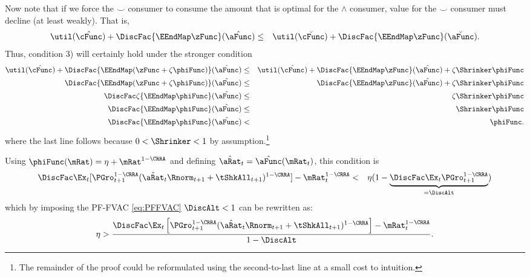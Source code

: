 \documentclass[titlepage]{\econtex}\providecommand{\texname}{BufferStockTheory}
\begin{document}
Now note that if we force the $\smile$ consumer to consume the amount that is
optimal for the $\wedge$ consumer, value for the $\smile$ consumer must decline (at least weakly).  That is,
\begin{eqnarray*}
\util(\hat{\cFunc})+\DiscFac \{\EEndMap \zFunc \}(\hat{\aFunc})  & \leq &\util(\breve{\cFunc})+\DiscFac \{\EEndMap \zFunc \}(\breve{\aFunc})
.
\end{eqnarray*}
Thus, condition 3) will certainly hold under the stronger condition
\begin{eqnarray*}
\util(\hat{\cFunc})+\DiscFac\{\EEndMap (\zFunc+\zeta \phiFunc) \}(\hat{\aFunc})  & \leq & \util(\hat{\cFunc})+\DiscFac\{\EEndMap \zFunc \}(\hat{\aFunc})  + \zeta \Shrinker \phiFunc
\\ \DiscFac\{\EEndMap (\zFunc+\zeta \phiFunc) \}(\hat{\aFunc})  & \leq & \DiscFac\{\EEndMap \zFunc  \}(\hat{\aFunc})  + \zeta \Shrinker \phiFunc
\\ \DiscFac\zeta \{\EEndMap \phiFunc \}(\hat{\aFunc})  & \leq & \zeta \Shrinker \phiFunc
\\ \DiscFac\{\EEndMap \phiFunc \}(\hat{\aFunc})  & \leq & \Shrinker \phiFunc
\\ \DiscFac\{\EEndMap \phiFunc \}(\hat{\aFunc})  & < & \phiFunc \label{eq:reqCondWeak}
.
\end{eqnarray*}
where the last line follows because $0 < \Shrinker < 1$ by assumption.\footnote{The remainder of the proof could be reformulated using the second-to-last line at a small cost to intuition.}
  
Using $\phiFunc(\mRat)= \eta + \mRat^{1-\CRRA}$
and defining $\hat{\aRat}_{t}=\hat{\aFunc}(\mRat_{t})$, this condition is
\begin{eqnarray*}
\DiscFac \Ex_{t}[{\PGro}_{t+1}^{1-\CRRA}(\hat{\aRat}_{t}\Rnorm_{t+1}+\tShkAll_{t+1})^{1-\CRRA}]-\mRat_{t}^{1-\CRRA} & < & \eta(1-\underbrace{\DiscFac\Ex_{t}{\PGro}_{t+1}^{1-\CRRA}}_{=\DiscAlt})
\end{eqnarray*}
which by imposing the
 PF-FVAC \eqref{eq:PFFVAC} 
  $\DiscAlt<1$ can be rewritten as:
\begin{eqnarray}
 \eta>\frac{\DiscFac \Ex_{t}\left[{\PGro}_{t+1}^{1-\CRRA}(\hat{\aRat}_{t}\Rnorm_{t+1}+\tShkAll_{t+1})^{1-\CRRA}\right]-\mRat_{t}^{1-\CRRA}}{1-\DiscAlt}\label{eq:KeyCondition}.
\end{eqnarray}
\end{document}
